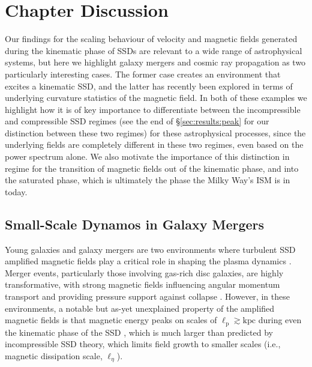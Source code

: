 \documentclass[12pt,twoside]{extreport}
\newcommand{\ie}{i.e.,\xspace} %
\newcommand{\eg}{e.g.,\xspace} %
\begin{document}
\section{Chapter Discussion}
\label{sec:discussion}

Our findings for the scaling behaviour of velocity and magnetic fields generated during the kinematic phase of SSDs are relevant to a wide range of astrophysical systems, but here we highlight galaxy mergers and cosmic ray propagation as two particularly interesting cases. The former case creates an environment that excites a kinematic SSD, and the latter has recently been explored in terms of underlying curvature statistics of the magnetic field. In both of these examples we highlight how it is of key importance to differentiate between the incompressible and compressible SSD regimes (see the end of \S\ref{sec:results:peak} for our distinction between these two regimes) for these astrophysical processes, since the underlying fields are completely different in these two regimes, even based on the power spectrum alone. We also motivate the importance of this distinction in regime for the transition of magnetic fields out of the kinematic phase, and into the saturated phase, which is ultimately the phase the Milky Way's ISM is in today.

\subsection{Small-Scale Dynamos in Galaxy Mergers}

Young galaxies \citep{geach2023polarized} and galaxy mergers are two environments where turbulent SSD amplified magnetic fields play a critical role in shaping the plasma dynamics \citep[\eg][]{pakmor2014magnetic, pakmor2017magnetic, martin2018three, martin2022towards, brzycki2019parameter, whittingham2021impact, whittingham2023impact, pfrommer2022simulating}. Merger events, particularly those involving gas-rich disc galaxies, are highly transformative, with strong magnetic fields influencing angular momentum transport and providing pressure support against collapse \citep{whittingham2021impact}. However, in these environments, a notable but as-yet unexplained property of the amplified magnetic fields is that magnetic energy peaks on scales of $\ell_\mathrm{p} \gtrsim \mathrm{kpc}$ during even the kinematic phase of the SSD \citep[\eg][]{rodenbeck2016magnetic, basu2017detection, brzycki2019parameter, whittingham2021impact, pfrommer2022simulating}, which is much larger than predicted by incompressible SSD theory, which limits field growth to smaller scales (\ie magnetic dissipation scale, $\ell_\eta$).
\end{document}
